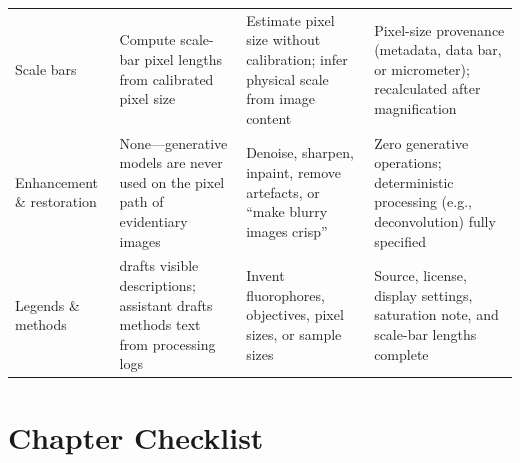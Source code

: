 \begin{table}[htbp]
\begin{tabularx}{\linewidth}{@{}>{\raggedright\arraybackslash}p{20mm}YYY@{}}
Scale bars & Compute scale-bar pixel lengths from calibrated pixel size & Estimate pixel size without calibration; infer physical scale from image content & Pixel-size provenance (metadata, data bar, or micrometer); recalculated after magnification \\
Enhancement \& restoration & None---generative models are never used on the pixel path of evidentiary images & Denoise, sharpen, inpaint, remove artefacts, or ``make blurry images crisp'' & Zero generative operations; deterministic processing (e.g., deconvolution) fully specified \\
Legends \& methods &  drafts visible descriptions; assistant drafts methods text from processing logs & Invent fluorophores, objectives, pixel sizes, or sample sizes & Source, license, display settings, saturation note, and scale-bar lengths complete \\
\bottomrule
\end{tabularx}
\end{table}

\section{Chapter Checklist}

